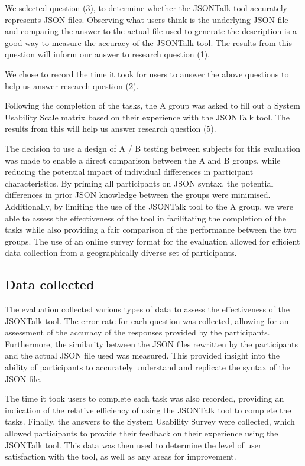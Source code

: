\documentclass{l4proj}
\begin{document}
We selected question (3), to determine whether the JSONTalk tool accurately represents JSON files. Observing what users think is the underlying JSON file and comparing the answer to the actual file used to generate the description is a good way to measure the accuracy of the JSONTalk tool. The results from this question will inform our answer to research question (1).

We chose to record the time it took for users to answer the above questions to help us answer research question (2).

Following the completion of the tasks, the A group was asked to fill out a System Usability Scale matrix based on their experience with the JSONTalk tool. The results from this will help us answer research question (5).

The decision to use a design of A / B testing between subjects for this evaluation was made to enable a direct comparison between the A and B groups, while reducing the potential impact of individual differences in participant characteristics. By priming all participants on JSON syntax, the potential differences in prior JSON knowledge between the groups were minimised. Additionally, by limiting the use of the JSONTalk tool to the A group, we were able to assess the effectiveness of the tool in facilitating the completion of the tasks while also providing a fair comparison of the performance between the two groups. The use of an online survey format for the evaluation allowed for efficient data collection from a geographically diverse set of participants.

\cite{JSON}

\subsection{Data collected}

The evaluation collected various types of data to assess the effectiveness of the JSONTalk tool. The error rate for each question was collected, allowing for an assessment of the accuracy of the responses provided by the participants. Furthermore, the similarity between the JSON files rewritten by the participants and the actual JSON file used was measured. This provided insight into the ability of participants to accurately understand and replicate the syntax of the JSON file.

The time it took users to complete each task was also recorded, providing an indication of the relative efficiency of using the JSONTalk tool to complete the tasks. Finally, the answers to the System Usability Survey were collected, which allowed participants to provide their feedback on their experience using the JSONTalk tool. This data was then used to determine the level of user satisfaction with the tool, as well as any areas for improvement.
\end{document}
